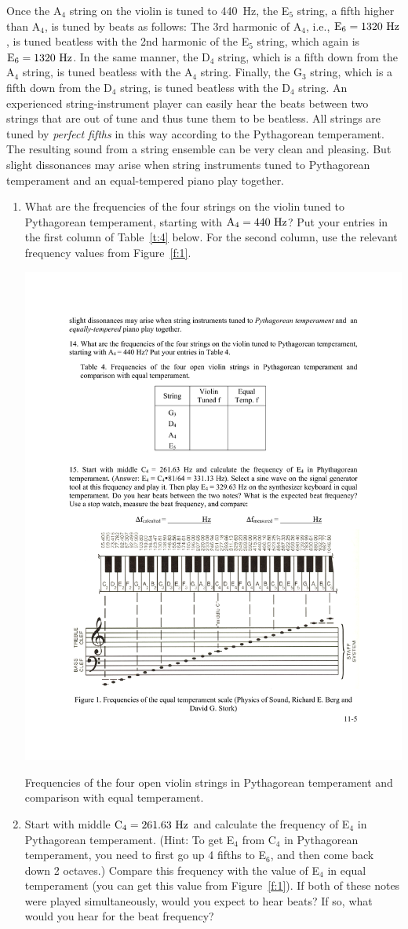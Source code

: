 \documentclass[11pt]{NSF}
\def\ben{\begin{enumerate}}
\def\een{\end{enumerate}}
\begin{document}
Once the A$_4$ string on the violin is tuned to 440~Hz, 
the E$_5$ string, a fifth higher than A$_4$, is tuned by beats
as follows: 
The 3rd harmonic of A$_4$, i.e., ${\rm E}_6 = 1320~{\rm Hz}$, 
is tuned beatless with the 2nd harmonic of the E$_5$ string,
which again is ${\rm E}_6 = 1320~{\rm Hz}$. 
In the same manner, the D$_4$ string, which is a fifth down 
from the A$_4$ string, is tuned beatless with the A$_4$ string. 
Finally, the G$_3$ string, which is a fifth down from the D$_4$
string, is tuned beatless with the D$_4$ string. 
An experienced string-instrument player can easily hear the beats 
between two strings that
are out of tune and thus tune them to be beatless. All strings are
tuned by {\em perfect fifths} in this way according to the Pythagorean
temperament. The resulting sound from a string ensemble can be very
clean and pleasing. But slight dissonances may arise when string
instruments tuned to Pythagorean temperament and an equal-tempered
piano play together.

\ben
\item
What are the frequencies of the four strings on the violin tuned to
Pythagorean temperament, starting with ${\rm A}_4 = 440~{\rm Hz}$? 
Put your entries in the first column of Table~\ref{t:4} below.
For the second column, use the relevant frequency values from Figure~\ref{f:1}.
%
\begin{table}[hbtp]
\begin{center}
\includegraphics[width=.35\textwidth]{tab11_4}
\caption{Frequencies of the four open violin strings in Pythagorean
temperament and comparison with equal temperament.}
\label{t:4}
\end{center}
\end{table}
%

\item
Start with middle ${\rm C}_4 = 261.63~{\rm Hz}$ and calculate 
the frequency of E$_4$ in Pythagorean temperament. 
(Hint: To get E$_4$ from C$_4$ in Pythagorean temperament,
you need to first go up 4 fifths to E$_6$, and then come 
back down 2 octaves.)
Compare this frequency with the value of E$_4$ in equal 
temperament (you can get this value from  Figure~\ref{f:1}).
If both of these notes were played simultaneously, would you 
expect to hear beats?
If so, what would you hear for the beat frequency?

\een
\end{document}
